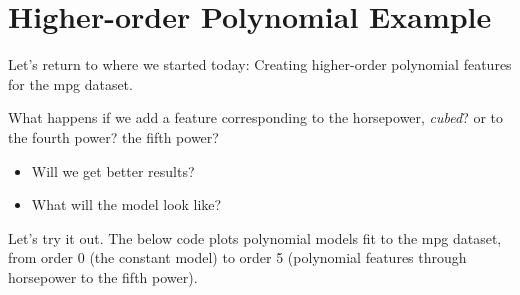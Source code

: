 \documentclass[
  letterpaper,
  DIV=11,
  numbers=noendperiod]{scrreprt}
\providecommand{\tightlist}{%
  \setlength{\itemsep}{0pt}\setlength{\parskip}{0pt}}\usepackage{longtable,booktabs,array}
\begin{document}
\hypertarget{higher-order-polynomial-example}{%
\section{Higher-order Polynomial
Example}\label{higher-order-polynomial-example}}

Let's return to where we started today: Creating higher-order polynomial
features for the mpg dataset.

What happens if we add a feature corresponding to the horsepower,
\emph{cubed}? or to the fourth power? the fifth power?

\begin{itemize}
\tightlist
\item
  Will we get better results?
\item
  What will the model look like?
\end{itemize}

Let's try it out. The below code plots polynomial models fit to the mpg
dataset, from order 0 (the constant model) to order 5 (polynomial
features through horsepower to the fifth power).
\end{document}
